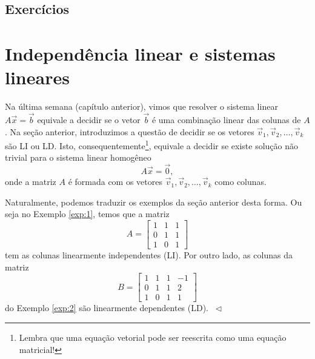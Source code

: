 \subsection*{Exercícios}

\construirExer


\section{Independência linear e sistemas lineares}

Na última semana (capítulo anterior), vimos que resolver o sistema linear $A \vec{x} = \vec{b}$ equivale a decidir se o vetor $\vec{b}$ é uma combinação linear das colunas de $A$. Na seção anterior, introduzimos a questão de decidir se os vetores $\vec{v}_1, \vec{v}_2, \dots, \vec{v}_k$ são LI ou LD. Isto, consequentemente\footnote{Lembra que uma equação vetorial pode ser reescrita como uma equação matricial!}, equivale a decidir se existe solução não trivial para o sistema linear homogêneo
\begin{equation}
A \vec{x} = \vec{0},
\end{equation} onde a matriz $A$ é formada com os vetores $\vec{v}_1, \vec{v}_2, \dots, \vec{v}_k$ como colunas.

\begin{ex}
Naturalmente, podemos traduzir os exemplos da seção anterior desta forma. Ou seja no Exemplo \ref{exp:1}, temos que a matriz
\begin{equation}
A = \left[
  \begin{array}{ccc}
    1 & 1 & 1  \\
    0 & 1 & 1   \\
    1 & 0 & 1
    \end{array}
\right]
\end{equation} tem as colunas linearmente independentes (LI). Por outro lado, as colunas da matriz
\begin{equation}
B = \left[
  \begin{array}{cccc}
    1 & 1 & 1 & -1 \\
    0 & 1 & 1 & 2  \\
    1 & 0 & 1 & 1
  \end{array}
\right]
\end{equation} do Exemplo \ref{exp:2} são linearmente dependentes (LD). $\ \lhd$
\end{ex}

